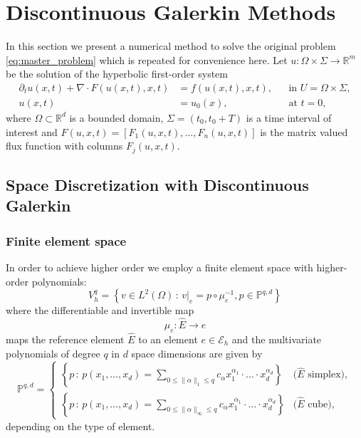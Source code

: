\documentclass[a4paper,12pt]{article}
\theoremstyle{definition}
\theoremstyle{definition}
\newcommand{\Dim}{d}
\begin{document}
\section{Discontinuous Galerkin Methods}

In this section we present a numerical method to solve the original
problem \eqref{eq:master_problem} which is repeated for convenience here.
Let $u: \Omega\times\Sigma\to\mathbb{R}^m$ be the solution of the
hyperbolic first-order system
\begin{subequations}
	\label{eq:master_problem_repeated}
	\begin{align}
	\partial_t u(x,t) + \nabla\cdot F(u(x,t),x,t) &= f(u(x,t),x,t), &&\text{in $U=\Omega\times\Sigma$}, \\
	u(x,t) &= u_0(x), &&\text{at $t=0$},
	\end{align}
\end{subequations}
where $\Omega\subset\mathbb{R}^{\Dim}$ is a bounded domain, $\Sigma=(t_0,t_0+T)$
is a time interval of interest and $F(u,x,t)=[F_1(u,x,t),\ldots,F_n(u,x,t)]$ is the
matrix valued flux function with columns $F_j(u,x,t)$.

\subsection{Space Discretization with Discontinuous Galerkin}


\subsubsection*{Finite element space}


In order to achieve higher order we employ a finite element space with higher-order polynomials:
\begin{equation}
V_h^q = \left\{ v\in L^2(\Omega) \,:\, 
v|_e = p\circ\mu_e^{-1}, p\in\mathbb{P}^{q,d}\right\}
\end{equation}
where the differentiable and invertible map $$\mu_e : \hat{E} \to e$$
maps the reference element $\hat{E}$ to an element $e\in\mathcal{E}_h$ and the multivariate
polynomials of degree $q$ in $d$ space dimensions are given by
\begin{equation*}
\mathbb{P}^{q,d} = \left\{\begin{array}{ll}
\left\{ p\,:\, p(x_1,\ldots,x_d) = \sum\limits_{0\leq\|\alpha\|_1\leq q} c_\alpha
x_1^{\alpha_1}\cdot\ldots\cdot x_d^{\alpha_d}\right\} & \text{($\hat{E}$ simplex)}, \\
\left\{ p\,:\, p(x_1,\ldots,x_d) = \sum\limits_{0\leq\|\alpha\|_\infty\leq q} c_\alpha
x_1^{\alpha_1}\cdot\ldots\cdot x_d^{\alpha_d}\right\} & \text{($\hat{E}$ cube)},
\end{array}\right .
\end{equation*}
depending on the type of element.
\end{document}

